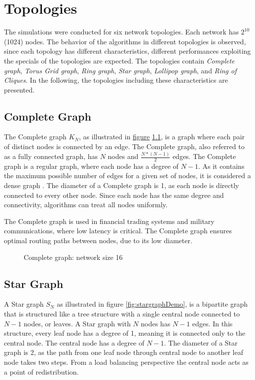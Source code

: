 \chapter{Topologies}\label{chap:topologies}
The simulations were conducted for six network topologies. Each network has $2^{10}$ (1024) nodes. The behavior of the algorithms in different topologies is observed, since each topology has different characteristics, different performances exploiting the specials of the topologies are expected. The topologies contain \textit{Complete graph}, \textit{Torus Grid graph}, \textit{Ring graph}, \textit{Star graph}, \textit{Lollipop graph}, and \textit{Ring of Cliques}. In the following, the topologies including these characteristics are presented.

\section{Complete Graph}\label{sec:2completegraph}
The Complete graph $K_N$, as illustrated in \hyperref[fig:completegraphDemo]{figure} \ref{fig:completegraphDemo}, is a graph where each pair of distinct nodes is connected by an edge. The Complete graph, also referred to as a fully connected graph, has $N$ nodes and $\frac{N*(N-1)}{2}$ edges. The Complete graph is a regular graph, where each node has a degree of $N-1$. As it contains the maximum possible number of edges for a given set of nodes, it is considered a dense graph \cite{GraphTheorySchindelhaauer2021}. The diameter of a Complete graph is 1, as each node is directly connected to every other node. Since each node has the same degree and connectivity, algorithms can treat all nodes uniformly.

The Complete graph is used in financial trading systems and military communications, where low latency is critical. The Complete graph ensures optimal routing paths between nodes, due to its low diameter. \cite{Banerjee2001}

\begin{figure}[H]
    \centering
    
    \caption{Complete graph: network size 16}
    \label{fig:completegraphDemo}
\end{figure}

\section{Star Graph}\label{sec:2stargraph}
A Star graph $S_N$ as illustrated in figure \ref{fig:stargraphDemo}, is a bipartite graph \cite{west2001introduction} that is structured like a tree structure with a single central node connected to $N-1$ nodes, or leaves. A Star graph with $N$ nodes has $N-1$ edges. In this structure, every leaf node has a degree of 1, meaning it is connected only to the central node. The central node has a degree of $N-1$. The diameter of a Star graph is 2, as the path from one leaf node through central node to another leaf node takes two steps. From a load balancing perspective the central node acts as a point of redistribution.

